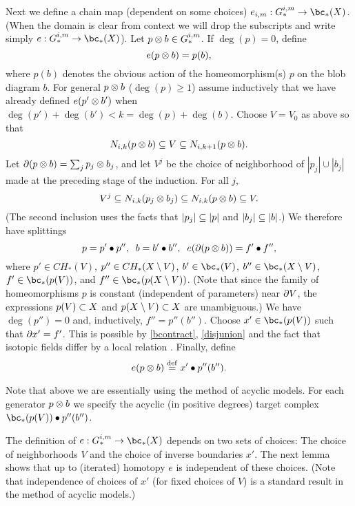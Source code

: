 Next we define a chain map (dependent on some choices) $e_{i,m}: G_*^{i,m} \to \bc_*(X)$.
(When the domain is clear from context we will drop the subscripts and write
simply  $e: G_*^{i,m} \to \bc_*(X)$).
Let $p\otimes b \in G_*^{i,m}$.
If $\deg(p) = 0$, define
\[
	e(p\otimes b) = p(b) ,
\]
where $p(b)$ denotes the obvious action of the homeomorphism(s) $p$ on the blob diagram $b$.
For general $p\otimes b$ ($\deg(p) \ge 1$) assume inductively that we have already defined
$e(p'\otimes b')$ when $\deg(p') + \deg(b') < k = \deg(p) + \deg(b)$.
Choose $V = V_0$ as above so that 
\[
	N_{i,k}(p\otimes b) \subseteq V \subseteq N_{i,k+1}(p\otimes b) .
\]
Let $\partial(p\otimes b) = \sum_j p_j\otimes b_j$, and let $V^j$ be the choice of neighborhood
of $|p_j|\cup |b_j|$ made at the preceding stage of the induction.
For all $j$, 
\[
	V^j \subseteq N_{i,k}(p_j\otimes b_j) \subseteq N_{i,k}(p\otimes b) \subseteq V .
\]
(The second inclusion uses the facts that $|p_j| \subseteq |p|$ and $|b_j| \subseteq |b|$.)
We therefore have splittings
\[
	p = p'\bullet p'' , \;\; b = b'\bullet b'' , \;\; e(\partial(p\otimes b)) = f'\bullet f'' ,
\]
where $p' \in CH_*(V)$, $p'' \in CH_*(X\setminus V)$, 
$b' \in \bc_*(V)$, $b'' \in \bc_*(X\setmin V)$, 
$f' \in \bc_*(p(V))$, and $f'' \in \bc_*(p(X\setmin V))$.
(Note that since the family of homeomorphisms $p$ is constant (independent of parameters)
near $\partial V$, the expressions $p(V) \subset X$ and $p(X\setminus V) \subset X$ are
unambiguous.)
We have $\deg(p'') = 0$ and, inductively, $f'' = p''(b'')$.
Choose $x' \in \bc_*(p(V))$ such that $\partial x' = f'$.
This is possible by \ref{bcontract}, \ref{disjunion} and the fact that isotopic fields
differ by a local relation .
Finally, define
\[
	e(p\otimes b) \stackrel{\mathrm{def}}{=} x' \bullet p''(b'') .
\]

Note that above we are essentially using the method of acyclic models.
For each generator $p\otimes b$ we specify the acyclic (in positive degrees) 
target complex $\bc_*(p(V)) \bullet p''(b'')$.

The definition of $e: G_*^{i,m} \to \bc_*(X)$ depends on two sets of choices:
The choice of neighborhoods $V$ and the choice of inverse boundaries $x'$.
The next lemma shows that up to (iterated) homotopy $e$ is independent
of these choices.
(Note that independence of choices of $x'$ (for fixed choices of $V$)
is a standard result in the method of acyclic models.)


